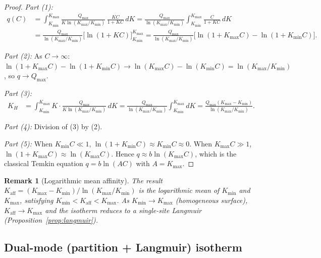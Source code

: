 \documentclass[12pt]{article}
\newtheorem{remark}{Remark}
\begin{document}
\begin{proof}
\textit{Part (1):}
\begin{align*}
  q(C) &= \int_{K_{\min}}^{K_{\max}}
    \frac{Q_{\max}}{K\ln(K_{\max}/K_{\min})}
    \,\frac{KC}{1+KC}\,dK
  = \frac{Q_{\max}}{\ln(K_{\max}/K_{\min})}
    \int_{K_{\min}}^{K_{\max}}
    \frac{C}{1+KC}\,dK \\
  &= \frac{Q_{\max}}{\ln(K_{\max}/K_{\min})}
    \bigl[\ln(1+KC)\bigr]_{K_{\min}}^{K_{\max}}
  = \frac{Q_{\max}}{\ln(K_{\max}/K_{\min})}
    \bigl[\ln(1+K_{\max}C)-\ln(1+K_{\min}C)\bigr].
\end{align*}

\textit{Part (2):} As $C\to\infty$:
$\ln(1+K_{\max}C)-\ln(1+K_{\min}C)\to
\ln(K_{\max}C)-\ln(K_{\min}C)=\ln(K_{\max}/K_{\min})$,
so $q\to Q_{\max}$.

\textit{Part (3):}
\begin{align*}
  K_H &= \int_{K_{\min}}^{K_{\max}}
    K\cdot\frac{Q_{\max}}{K\ln(K_{\max}/K_{\min})}\,dK
  = \frac{Q_{\max}}{\ln(K_{\max}/K_{\min})}
    \int_{K_{\min}}^{K_{\max}} dK
  = \frac{Q_{\max}(K_{\max}-K_{\min})}
        {\ln(K_{\max}/K_{\min})}.
\end{align*}

\textit{Part (4):} Division of (3) by (2).

\textit{Part (5):} When $K_{\min}C\ll 1$,
$\ln(1+K_{\min}C)\approx K_{\min}C\approx 0$.
When $K_{\max}C\gg 1$,
$\ln(1+K_{\max}C)\approx \ln(K_{\max}C)$.
Hence $q\approx b\ln(K_{\max}C)$, which is the classical
Temkin equation $q=b\ln(AC)$ with $A=K_{\max}$.
\end{proof}

\begin{remark}[Logarithmic mean affinity]
The result $K_{\mathrm{aff}}=(K_{\max}-K_{\min})/
\ln(K_{\max}/K_{\min})$ is the \emph{logarithmic mean}
of $K_{\min}$ and $K_{\max}$, satisfying
$K_{\min}<K_{\mathrm{aff}}<K_{\max}$.
As $K_{\min}\to K_{\max}$ (homogeneous surface),
$K_{\mathrm{aff}}\to K_{\max}$ and the isotherm reduces to a
single-site Langmuir (Proposition~\ref{prop:langmuir}).
\end{remark}

\subsection{Dual-mode (partition + Langmuir) isotherm}
\end{document}
